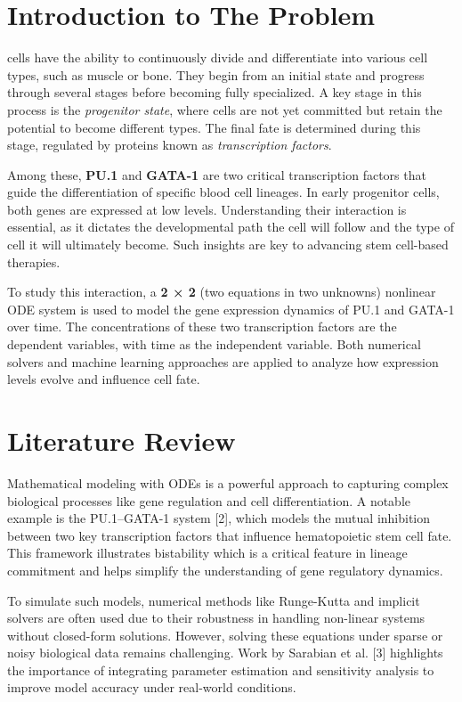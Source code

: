 \documentclass[journal]{IEEEtran}
\begin{document}
\section{Introduction to The Problem}
 cells have the ability to continuously divide and differentiate into various cell types, such as muscle or bone. They begin from an initial state and progress through several stages before becoming fully specialized. A key stage in this process is the \textit{progenitor state}, where cells are not yet committed but retain the potential to become different types. The final fate is determined during this stage, regulated by proteins known as \textit{transcription factors}.

Among these, \textbf{PU.1} and \textbf{GATA-1} are two critical transcription factors that guide the differentiation of specific blood cell lineages. In early progenitor cells, both genes are expressed at low levels. Understanding their interaction is essential, as it dictates the developmental path the cell will follow and the type of cell it will ultimately become. Such insights are key to advancing stem cell-based therapies.

To study this interaction, a \textbf{2 × 2} (two equations in two unknowns) nonlinear ODE system is used to model the gene expression dynamics of PU.1 and GATA-1 over time. The concentrations of these two transcription factors are the dependent variables, with time as the independent variable. Both numerical solvers and machine learning approaches are applied to analyze how expression levels evolve and influence cell fate.

\section{Literature Review}
Mathematical modeling with ODEs is a powerful approach to capturing complex biological processes like gene regulation and cell differentiation. A notable example is the PU.1–GATA-1 system [2], which models the mutual inhibition between two key transcription factors that influence hematopoietic stem cell fate. This framework illustrates bistability which is a critical feature in lineage commitment and helps simplify the understanding of gene regulatory dynamics.

To simulate such models, numerical methods like Runge-Kutta and implicit solvers are often used due to their robustness in handling non-linear systems without closed-form solutions. However, solving these equations under sparse or noisy biological data remains challenging. Work by Sarabian et al. [3] highlights the importance of integrating parameter estimation and sensitivity analysis to improve model accuracy under real-world conditions.
\end{document}
